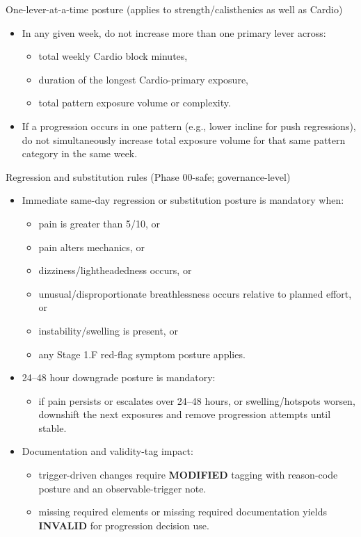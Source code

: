 \documentclass[10pt]{article}
\begin{document}
One-lever-at-a-time posture (applies to strength/calisthenics as well as Cardio)

\begin{itemize}
\item In any given week, do not increase more than one primary lever across:
  \begin{itemize}
  \item total weekly Cardio block minutes,
  \item duration of the longest Cardio-primary exposure,
  \item total pattern exposure volume or complexity.
  \end{itemize}
\item If a progression occurs in one pattern (e.g., lower incline for push regressions), do not simultaneously increase total exposure volume for that same pattern category in the same week.
\end{itemize}

Regression and substitution rules (Phase 00-safe; governance-level)

\begin{itemize}
\item Immediate same-day regression or substitution posture is mandatory when:
  \begin{itemize}
  \item pain is greater than 5/10, or
  \item pain alters mechanics, or
  \item dizziness/lightheadedness occurs, or
  \item unusual/disproportionate breathlessness occurs relative to planned effort, or
  \item instability/swelling is present, or
  \item any Stage 1.F red-flag symptom posture applies.
  \end{itemize}
\item 24–48 hour downgrade posture is mandatory:
  \begin{itemize}
  \item if pain persists or escalates over 24–48 hours, or swelling/hotspots worsen, downshift the next exposures and remove progression attempts until stable.
  \end{itemize}
\item Documentation and validity-tag impact:
  \begin{itemize}
  \item trigger-driven changes require \textbf{MODIFIED} tagging with reason-code posture and an observable-trigger note.
  \item missing required elements or missing required documentation yields \textbf{INVALID} for progression decision use.
  \end{itemize}
\end{itemize}
\end{document}
